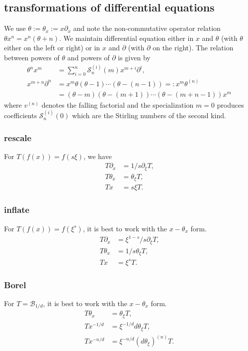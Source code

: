 \documentclass[12pt]{article}
\numberwithin{equation}{section}
\begin{document}
\subsection{transformations of differential equations}
We use $\theta := \theta_x := x \partial_x$ and note the non-commutative operator relation $\theta x^n = x^n (\theta+n)$. We maintain differential equation either in $x$ and $\theta$ (with $\theta$ either on the left or right) or in $x$ and $\partial$ (with $\partial$ on the right). The relation between powers of $\theta$ and powers of $\partial$ is given by
\begin{align*}
\theta^n x^m &= \sum_{i=0}^{n} \mathcal{S}_{n}^{(i)}(m) x^{m+i} \partial^i\text{,}\\
x^{m+n} \partial^n &= x^m \theta (\theta-1)\cdots(\theta-(n-1)) =:x^m \theta^{(n)}\\
&= (\theta-m)(\theta-(m+1))\cdots(\theta-(m+n-1))x^m
\end{align*}
where $v^{(n)}$ denotes the falling factorial and the specialization $m=0$ produces coefficients $\mathcal{S}_{n}^{(i)}(0)$ which are the Stirling numbers of the second kind.

\subsubsection{rescale}
For $T(f(x)) = f(s \xi)$, we have
\begin{align*}
T \partial_x &= 1/s \partial_{\xi} T\text{,}\\
T \theta_x &= \theta_{\xi} T \text{,}\\
T x &= s \xi T\text{.}
\end{align*}

\subsubsection{inflate}
For $T(f(x)) = f(\xi^s)$, it is best to work with the $x-\theta_x$ form.
\begin{align*}
T \partial_x &= \xi^{1-s}/s \partial_{\xi} T\text{,}\\
T \theta_x &= 1/s \theta_{\xi} T \text{,}\\
T x &= \xi^s T\text{.}
\end{align*}

\subsubsection{Borel}
For $T=\mathcal{B}_{1/d}$, it is best to work with the $x-\theta_x$ form.
\begin{align*}
T \theta_x &= \theta_{\xi} T\text{,}\\
T x^{-1/d} &= \xi^{-1/d} d \theta_{\xi} T \text{,}\\
T x^{-n/d} &= 
\xi^{-n/d} (d \theta_\xi)^{(n)} T\text{.}
\end{align*}
\end{document}
